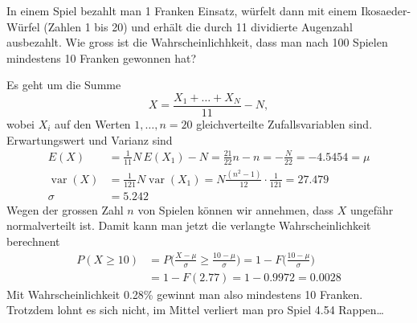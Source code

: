 In einem Spiel bezahlt man 1 Franken Einsatz, würfelt dann mit
einem Ikosaeder-Würfel (Zahlen 1 bis 20) und erhält die durch 11 dividierte
Augenzahl ausbezahlt. Wie gross ist die Wahrscheinlichhkeit,
dass man nach 100 Spielen mindestens 10 Franken gewonnen hat?


\begin{loesung}
Es geht um die Summe
\[
X=\frac{X_1+\dots +X_N}{11} - N,
\]
wobei $X_i$ auf den
Werten $1,\dots,n=20$ gleichverteilte Zufallsvariablen sind.
Erwartungswert und Varianz
sind
\begin{align*}
E(X)&=\frac1{11}N\,E(X_1)-N=\frac{21}{22}n-n=-\frac{N}{22}
=-4.5454=\mu
\\
\operatorname{var}(X)&=\frac1{121}N\operatorname{var}(X_1)=N\frac{(n^2-1)}{12}\cdot\frac1{121}
=27.479
\\
\sigma&=5.242
\end{align*}
Wegen der grossen Zahl $n$ von Spielen können wir annehmen, dass
$X$ ungefähr normalverteilt ist.
Damit kann man jetzt die verlangte Wahrscheinlichkeit berechnent
\begin{align*}
P(X \ge 10)&=P\biggl(
\frac{X-\mu}{\sigma}\ge\frac{10-\mu}{\sigma}
\biggr)
=1-F\biggl(
\frac{10-\mu}{\sigma}
\biggr)
\\
&=1-F(2.77)=1-0.9972=0.0028
\end{align*}
Mit Wahrscheinlichkeit 0.28\% gewinnt man also mindestens 10 Franken.
Trotzdem lohnt es sich nicht, im Mittel verliert man pro Spiel
4.54 Rappen\dots
\end{loesung}

